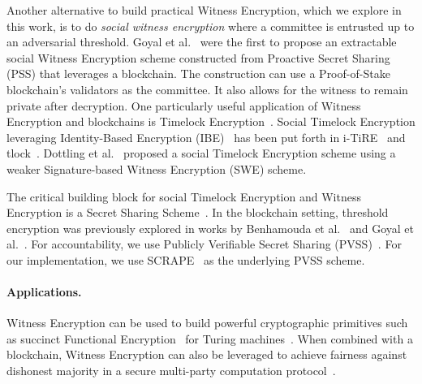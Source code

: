 Another alternative to build practical Witness Encryption, which we explore in this work, is to do \emph{social witness encryption} where a committee is entrusted up to an adversarial threshold.
Goyal et al.~\cite{eweb} were the first to propose an extractable social Witness Encryption scheme constructed from Proactive Secret Sharing (PSS) that leverages a blockchain.
The construction can use a Proof-of-Stake blockchain's validators as the committee.
It also allows for the witness to remain private after decryption.
One particularly useful application of Witness Encryption and blockchains is Timelock Encryption~\cite{timelock_puzzles,timelock_from_crc,timed_release_cryptography}.
Social Timelock Encryption leveraging Identity-Based Encryption (IBE)~\cite{ibe} has been put forth in i-TiRE~\cite{i-TiRE} and tlock~\cite{tlock}.
Dottling et al.~\cite{mcfly} proposed a social Timelock Encryption scheme using a weaker Signature-based Witness Encryption (SWE) scheme.

The critical building block for social Timelock Encryption and Witness Encryption is a Secret Sharing Scheme~\cite{shamir_ss}. In the blockchain setting, threshold encryption was previously explored in works by Benhamouda et al.~\cite{benhamouda_ecpss} and Goyal et al.~\cite{eweb}.
For accountability, we use Publicly Verifiable Secret Sharing (PVSS)~\cite{first_pvss_chor,pvss_stadler}.
For our implementation, we use SCRAPE~\cite{pvss_scrape} as the underlying PVSS scheme.

\paragraph{Applications.}
Witness Encryption can be used to build powerful cryptographic primitives such as succinct Functional Encryption~\cite{functional_encryption} for Turing machines~\cite{turing_machine_fe}.
When combined with a blockchain, Witness Encryption can also be leveraged to achieve fairness against dishonest majority in a secure multi-party computation protocol~\cite{we_mpc_fairness}.